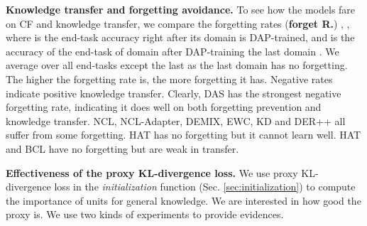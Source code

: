 \documentclass{article} \usepackage{iclr2023_conference,times}
\begin{document}
\textbf{Knowledge transfer and forgetting avoidance.} To see how the models fare on CF and knowledge transfer, we compare the forgetting rates (\textbf{forget R.}) \citep{DBLP:conf/cvpr/LiuSLSS20}, , where  is the end-task accuracy right after its domain  is DAP-trained, and  is the accuracy of the end-task of domain  after DAP-training the last domain . We average over all end-tasks except the last as the last domain has no forgetting. The higher the forgetting rate is, the more forgetting it has. Negative rates indicate positive knowledge transfer. Clearly, DAS has the strongest negative forgetting rate, indicating it does well on both forgetting prevention and knowledge transfer. NCL, NCL-Adapter, DEMIX, EWC, KD and DER++ all suffer from some forgetting. HAT has no forgetting but it cannot learn well. HAT and BCL have no forgetting but are weak in  transfer.


\textbf{Effectiveness of the proxy KL-divergence loss.} We use proxy KL-divergence loss in the \textit{initialization} function (Sec. \ref{sec:initialization}) to compute the importance of units for general knowledge. We are interested in how good the proxy is. We use two kinds of experiments to provide evidences. 
\end{document}
